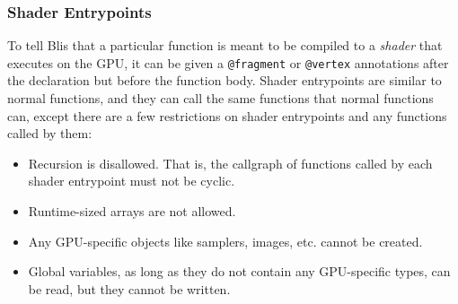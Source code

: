 \documentclass[11pt]{article}
\newcommand{\code}[1]{\texttt{#1}}
\begin{document}
\subsubsection{Shader Entrypoints}

To tell Blis that a particular function is meant to be compiled to a \textit{shader} that executes on the GPU, it can be given a \code{@fragment} or \code{@vertex} annotations after the declaration but before the function body. Shader entrypoints are similar to normal functions, and they can call the same functions that normal functions can, except there are a few restrictions on shader entrypoints and any functions called by them:

\begin{itemize}
    \item Recursion is disallowed. That is, the callgraph of functions called by each shader entrypoint must not be cyclic.
    \item Runtime-sized arrays are not allowed.
    \item Any GPU-specific objects like samplers, images, etc. cannot be created.
    \item Global variables, as long as they do not contain any GPU-specific types, can be read, but they cannot be written.
\end{itemize}






\end{document}
